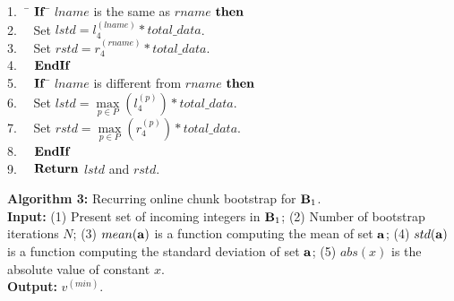 \documentclass[lettersize,journal]{IEEEtran}
\begin{document}
\begin{tabbing}
1.~~\= ${\bf If}$ \= $lname$ is the same as $rname$ ${\bf then}$ \\
2.~~\>            \> Set $lstd = l^{(lname)}_{4} * total\_data$. \\
3.~~\>            \> Set $rstd = r^{(rname)}_{4} * total\_data$. \\
4.~~\> ${\bf EndIf}$ \\
5.~~\> ${\bf If}$ \= $lname$ is different from $rname$ ${\bf then}$ \\
6.~~\>            \> Set $lstd = \max\limits_{p \in P} (l^{(p)}_{4}) * total\_data$. \\ 
7.~~\>            \> Set $rstd = \max\limits_{p \in P} (r^{(p)}_{4}) * total\_data$. \\ 
8.~~\> ${\bf EndIf}$ \\
9.~~\> ${\bf Return}$ $lstd$ and $rstd$.
\end{tabbing}

\vspace{0.2in}
\noindent
{\bf Algorithm 3:} Recurring online chunk bootstrap for ${\bf B}_{1}$. \\

\noindent
{\bf Input:} (1) Present set of incoming integers in ${\bf B}_{1}$; (2) Number of bootstrap iterations 
$N$; (3) $mean({\bf a})$ is a function computing the mean of set ${\bf a}$; (4) $std({\bf a})$ is a 
function computing the standard deviation of set ${\bf a}$; (5) $abs(x)$ is the absolute value of 
constant $x$. \\
{\bf Output:} $v^{(min)}$.
\end{document}
